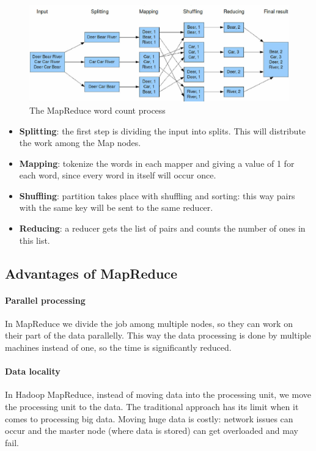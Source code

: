 \begin{figure}[H]
	\includegraphics[width=150mm, keepaspectratio]{figures/MapReduce_Example.png}
	\caption{The MapReduce word count process \cite{MapReduce-example-figure}}
	\centering
\end{figure}
\begin{itemize}
	\item \textbf{Splitting}: the first step is dividing the input into splits. This will distribute the work among the Map nodes.
	\item \textbf{Mapping}: tokenize the words in each mapper and giving a value of 1 for each word, since every word in itself will occur once.
	\item \textbf{Shuffling}: partition takes place with shuffling and sorting: this way pairs with the same key will be sent to the same reducer.
	\item \textbf{Reducing}: a reducer gets the list of pairs and counts the number of ones in this list.
\end{itemize}

\subsection{Advantages of MapReduce \cite{MapReduce-example}}
\paragraph{Parallel processing}
In MapReduce we divide the job among multiple nodes, so they can work on their part of the data parallelly. This way the data processing is done by multiple machines instead of one, so the time is significantly reduced.
\paragraph{Data locality}
In Hadoop MapReduce, instead of moving data into the processing unit, we move the processing unit to the data. The traditional approach has its limit when it comes to processing big data. Moving huge data is costly: network issues can occur and the master node (where data is stored) can get overloaded and may fail. 

